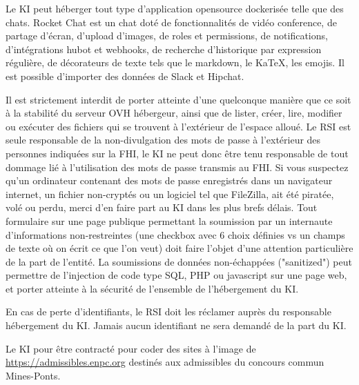 \documentclass{ki019}
\begin{document}

Le KI peut héberger tout type d'application opensource dockerisée telle que des chats.
Rocket Chat est un chat doté de fonctionnalités de vidéo conference, de partage d'écran, d'upload d'images, de roles et permissions, de notifications, d'intégrations hubot et webhooks, de recherche d'historique par expression régulière, de décorateurs de texte tels que le markdown, le KaTeX, les emojis. Il est possible d'importer des données de Slack et Hipchat.



Il est strictement interdit de porter atteinte d'une quelconque manière que ce soit à la stabilité du serveur OVH hébergeur, ainsi que de lister, créer, lire, modifier ou exécuter des fichiers qui se trouvent à l'extérieur de l'espace alloué.
Le RSI est seule responsable de la non-divulgation des mots de passe à l'extérieur des personnes indiquées sur la FHI, le KI ne peut donc être tenu responsable de tout dommage lié à l'utilisation des mots de passe transmis au FHI. Si vous suspectez qu'un ordinateur contenant des mots de passe enregistrés dans un navigateur internet, un fichier non-cryptés ou un logiciel tel que FileZilla, ait été piratée, volé ou perdu, merci d'en faire part au KI dans les plus brefs délais.
Tout formulaire sur une page publique permettant la soumission par un internaute d'informations non-restreintes (une checkbox avec 6 choix définies vs un champs de texte où on écrit ce que l'on veut) doit faire l'objet d'une attention particulière de la part de l'entité. La soumissions de données non-échappées ("sanitized") peut permettre de l'injection de code type SQL, PHP ou javascript sur une page web, et porter atteinte à la sécurité de l'ensemble de l'hébergement du KI.


En cas de perte d'identifiants, le RSI doit les réclamer auprès du responsable hébergement du KI. Jamais aucun identifiant ne sera demandé de la part du KI.



Le KI pour être contracté pour coder des sites à l'image de \url{https://admissibles.enpc.org} destinés aux admissibles du concours commun Mines-Ponts.

\end{document}

